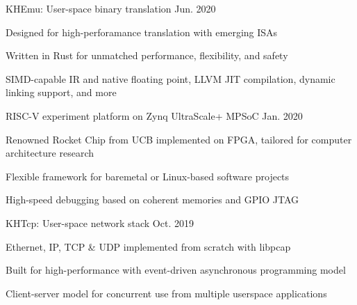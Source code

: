 

\begin{cventries}

  \cventry
    {KHEmu: User-space binary translation}
    {}{}
    {Jun. 2020} %
    {
      \begin{cvitems} %
        \item {Designed for high-perforamance translation with emerging ISAs}
        \item {Written in Rust for unmatched performance, flexibility, and safety}
        \item {SIMD-capable IR and native floating point, LLVM JIT compilation, dynamic linking support, and more}
      \end{cvitems}
    }

  \cventry
    {RISC-V experiment platform on Zynq UltraScale+ MPSoC} %
    {}{}
    {Jan. 2020} %
    {
      \begin{cvitems} %
        \item {Renowned Rocket Chip from UCB implemented on FPGA, tailored for computer architecture research}
        \item {Flexible framework for baremetal or Linux-based software projects}
        \item {High-speed debugging based on coherent memories and GPIO JTAG}
      \end{cvitems}
    }

  \cventry
    {KHTcp: User-space network stack} %
    {}{}
    {Oct. 2019} %
    {
        \begin{cvitems} %
        \item {Ethernet, IP, TCP \& UDP implemented from scratch with libpcap}
        \item {Built for high-performance with event-driven asynchronous programming model}
        \item {Client-server model for concurrent use from multiple userspace applications}
        \end{cvitems}
    }

\end{cventries}
